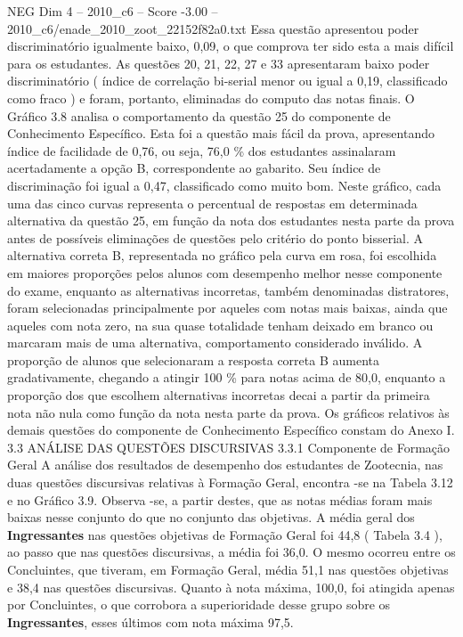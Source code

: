 \begin{textsample}{NEG Dim 4 – 2010\_c6 – Score -3.00 – 2010\_c6/enade\_2010\_zoot\_22152f82a0.txt}
Essa questão apresentou poder discriminatório igualmente baixo, 0,09, o que comprova ter sido esta a mais difícil para os estudantes.
As questões 20, 21, 22, 27 e 33 apresentaram baixo poder discriminatório ( índice de correlação bi-serial menor ou igual a 0,19, classificado como fraco ) e foram, portanto, eliminadas do computo das notas finais.
O Gráfico 3.8 analisa o comportamento da questão 25 do componente de Conhecimento Específico.
Esta foi a questão mais fácil da prova, apresentando índice de facilidade de 0,76, ou seja, 76,0 \% dos estudantes assinalaram acertadamente a opção B, correspondente ao gabarito.
Seu índice de discriminação foi igual a 0,47, classificado como muito bom.
Neste gráfico, cada uma das cinco curvas representa o percentual de respostas em determinada alternativa da questão 25, em função da nota dos estudantes nesta parte da prova antes de possíveis eliminações de questões pelo critério do ponto bisserial.
A alternativa correta B, representada no gráfico pela curva em rosa, foi escolhida em maiores proporções pelos alunos com desempenho melhor nesse componente do exame, enquanto as alternativas incorretas, também denominadas distratores, foram selecionadas principalmente por aqueles com notas mais baixas, ainda que aqueles com nota zero, na sua quase totalidade tenham deixado em branco ou marcaram mais de uma alternativa, comportamento considerado inválido.
A proporção de alunos que selecionaram a resposta correta B aumenta gradativamente, chegando a atingir 100 \% para notas acima de 80,0, enquanto a proporção dos que escolhem alternativas incorretas decai a partir da primeira nota não nula como função da nota nesta parte da prova.
Os gráficos relativos às demais questões do componente de Conhecimento Específico constam do Anexo I. 3.3 ANÁLISE DAS QUESTÕES DISCURSIVAS 3.3.1 Componente de Formação Geral A análise dos resultados de desempenho dos estudantes de Zootecnia, nas duas questões discursivas relativas à Formação Geral, encontra -se na Tabela 3.12 e no Gráfico 3.9.
Observa -se, a partir destes, que as notas médias foram mais baixas nesse conjunto do que no conjunto das objetivas.
A média geral dos \textbf{Ingressantes} nas questões objetivas de Formação Geral foi 44,8 ( Tabela 3.4 ), ao passo que nas questões discursivas, a média foi 36,0.
O mesmo ocorreu entre os Concluintes, que tiveram, em Formação Geral, média 51,1 nas questões objetivas e 38,4 nas questões discursivas.
Quanto à nota máxima, 100,0, foi atingida apenas por Concluintes, o que corrobora a superioridade desse grupo sobre os \textbf{Ingressantes}, esses últimos com nota máxima 97,5.

\end{textsample}
